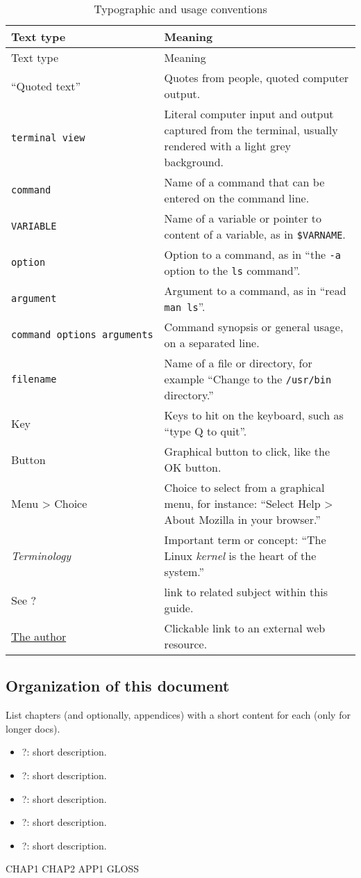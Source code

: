 \begin{longtable}[c]{@{}ll@{}}
\caption{Typographic and usage conventions}\tabularnewline
\toprule
Text type & Meaning\tabularnewline
\midrule
\endfirsthead
\toprule
Text type & Meaning\tabularnewline
\midrule
\endhead
``Quoted text'' & Quotes from people, quoted computer
output.\tabularnewline
\begin{verbatim}
terminal view
\end{verbatim}
 & Literal computer input and output captured from the terminal, usually
rendered with a light grey background.\tabularnewline
\texttt{command} & Name of a command that can be entered on the command
line.\tabularnewline
\texttt{VARIABLE} & Name of a variable or pointer to content of a
variable, as in \texttt{\$VARNAME}.\tabularnewline
\texttt{option} & Option to a command, as in ``the \texttt{-a} option to
the \texttt{ls} command''.\tabularnewline
\texttt{argument} & Argument to a command, as in ``read
\texttt{man\ ls}''.\tabularnewline
\texttt{command\ options\ 
arguments} & Command synopsis or general usage, on a separated
line.\tabularnewline
\texttt{filename} & Name of a file or directory, for example ``Change to
the \texttt{/usr/bin} directory.''\tabularnewline
Key & Keys to hit on the keyboard, such as ``type Q to
quit''.\tabularnewline
Button & Graphical button to click, like the OK button.\tabularnewline
{Menu \textgreater{} Choice} & Choice to select from a graphical menu,
for instance: ``Select {Help \textgreater{} About Mozilla} in your
browser.''\tabularnewline
\emph{Terminology} & Important term or concept: ``The Linux
\emph{kernel} is the heart of the system.''\tabularnewline
See ? & link to related subject within this guide.\tabularnewline
\href{http://tille.soti.org}{The author} & Clickable link to an external
web resource.\tabularnewline
\bottomrule
\end{longtable}

\subsection{Organization of this document}\label{introux5f10}

List chapters (and optionally, appendices) with a short content for each
(only for longer docs).

\begin{itemize}
\item
  ?: short description.
\item
  ?: short description.
\item
  ?: short description.
\item
  ?: short description.
\item
  ?: short description.
\end{itemize}

CHAP1 CHAP2 APP1 GLOSS
